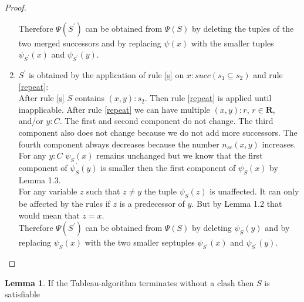 \documentclass[a4paper,11pt]{scrartcl}
\theoremstyle{break}
\theoremstyle{definition}
\newtheorem{mylem}{Lemma}
\begin{document}
\begin{proof}
\begin{enumerate}
Therefore $\Psi(S^\prime)$ can be obtained from $\Psi(S)$ by deleting the tuples of the two merged successors and by replacing $\psi(x)$ with the smaller tuples $\psi_{S^\prime}(x)$ and $\psi_{S^\prime}(y)$.
\item $S^\prime$ is obtained by the application of rule \ref{s} on $x:succ(s_1\subseteq s_2)$ and rule \ref{repeat}:\\ 
After rule \ref{s} $S$ contains $(x,y):s_2$. Then rule \ref{repeat} is applied until inapplicable. After rule \ref{repeat} we can have multiple $(x,y):r$, $r\in\mathbf{R}$, and/or $y:C$. The first and second component do not change. The third component also does not change because we do not add more successors. The fourth component always decreases because the number $n_{sc}(x,y)$ increases. For any $y:C$ $\psi_S(x)$ remains unchanged but we know that the first component of $\psi_S^\prime(y)$ is smaller then the first component of $\psi_S(x)$ by Lemma 1.3.\\
For any variable $z$ such that $z\neq y$ the tuple $\psi_S(z)$ is unaffected. It can only be affected by the rules if $z$ is a predecessor of $y$. But by Lemma 1.2 that would mean that $z=x$.\\
Therefore $\Psi(S^\prime)$ can be obtained from $\Psi(S)$ by deleting $\psi_S(y)$ and by replacing $\psi_S(x)$ with the two smaller septuples $\psi_{S^\prime}(x)$ and $\psi_{S^\prime}(y)$.
\end{enumerate}
\end{proof}
\begin{mylem}
If the Tableau-algorithm terminates without a clash then $S$ is satisfiable
\end{mylem}
\end{document}
